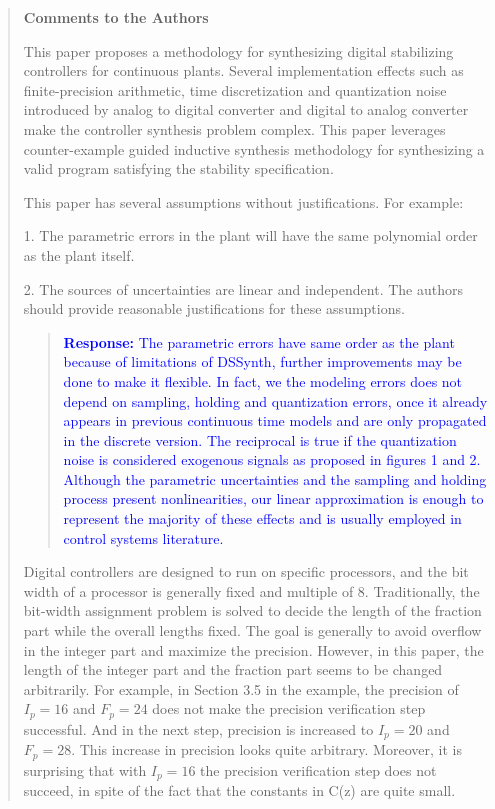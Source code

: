 \documentclass[11pt]{article}
\begin{document}
\begin{quote}

{\bf Comments to the Authors}

This paper proposes a methodology for synthesizing digital stabilizing controllers for continuous plants. Several implementation effects such as finite-precision arithmetic, time discretization and quantization noise introduced by analog to digital converter and digital to analog converter make the controller synthesis problem complex. This paper leverages counter-example guided inductive synthesis methodology for synthesizing a valid program satisfying the stability specification.  

This paper has several assumptions without justifications. For example:

1. The parametric errors in the plant will have the same polynomial order as the plant itself.

2. The sources of uncertainties are linear and independent.
The authors should provide reasonable justifications for these assumptions.

\begin{quote}
\textcolor{blue}{\textbf{Response:} The parametric errors have same order as the plant because of limitations of DSSynth, further improvements may be done to make it flexible. In fact, we the modeling errors does not depend on sampling, holding and quantization errors, once it already appears in previous continuous time models and are only propagated in the discrete version. The reciprocal is true if the quantization noise is considered exogenous signals as proposed in figures 1 and 2. Although the parametric uncertainties and the sampling and holding process present nonlinearities, our linear approximation is enough to represent the majority of these effects and is usually employed in control systems literature.}
\end{quote}

Digital controllers are designed to run on specific processors, and the bit width of a processor is generally fixed and multiple of 8. Traditionally, the bit-width assignment problem is solved to decide the length of the fraction part while the overall lengths fixed. The goal is generally to avoid overflow in the integer part and maximize the precision. However, in this paper, the length of the integer part and the fraction part seems to be changed arbitrarily. For example, in Section 3.5 in the example, the precision of $I_p = 16$ and $F_p = 24$ does not make the precision verification step successful. And in the next step, precision is increased to $I_p = 20$ and $F_p = 28$. This increase in precision looks quite arbitrary. Moreover, it is surprising that with $I_p = 16$ the precision verification step does not succeed, in spite of the fact that the constants in C(z) are quite small.


\end{quote}
\end{document}
